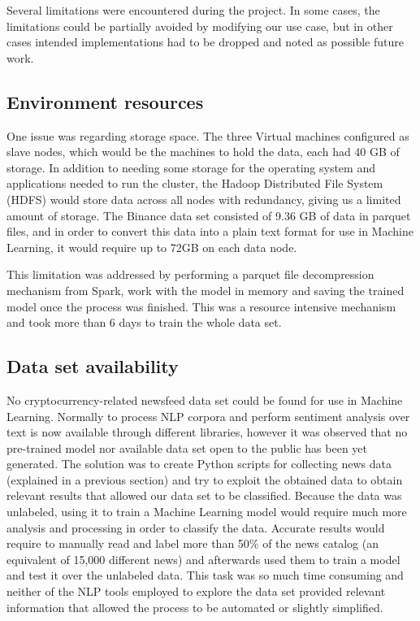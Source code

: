 Several limitations were encountered during the project. In some cases, the limitations could be partially avoided by modifying our use case, but in other cases intended implementations had to be dropped and noted as possible future work.

\subsection{Environment resources}

One issue was regarding storage space. The three Virtual machines configured as slave nodes, which would be the machines to hold the data, each had 40 GB of storage. In addition to needing some storage for the operating system and applications needed to run the cluster, the Hadoop Distributed File System (HDFS) would store data across all nodes with redundancy, giving us a limited amount of storage. The Binance data set consisted of 9.36 GB of data in parquet files, and in order to convert this data into a plain text format for use in Machine Learning, it would require up to 72GB on each data node.

This limitation was addressed by performing a parquet file decompression mechanism from Spark, work with the model in memory and saving the trained model once the process was finished. This was a resource intensive mechanism and took more than 6 days to train the whole data set.

\subsection{Data set availability }

No cryptocurrency-related newsfeed data set could be found for use in Machine Learning. Normally to process NLP corpora and perform sentiment analysis over text is now available through different libraries, however it was observed that no pre-trained model nor available data set open to the public has been yet generated. The solution was to create Python scripts for collecting news data (explained in a previous section) and try to exploit the obtained data to obtain relevant results that allowed our data set to be classified. Because the data was unlabeled, using it to train a Machine Learning model would require much more analysis and processing in order to classify the data. Accurate results would require to manually read and label more than 50\% of the news catalog (an equivalent of 15,000 different news) and afterwards used them to train a model and test it over the unlabeled data. This task was so much time consuming and neither of the NLP tools employed to explore the data set provided relevant information that allowed the process to be automated or slightly simplified.

